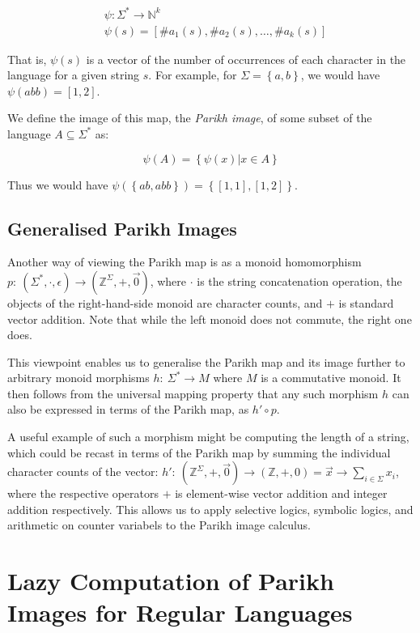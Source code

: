 \documentclass[runningheads]{llncs}
\begin{document}
$$
\begin{aligned}
& \psi: \Sigma^* \rightarrow \mathbb{N}^k \\
& \psi(s) = \left[\#a_1(s), \#a_2(s), \ldots, \#a_k(s)\right]
\end{aligned}
$$

That is, $\psi(s)$ is a vector of the number of occurrences of each character in the language for a given string $s$. For example, for  $\Sigma = \left \{ a, b\right\}$, we would have $\psi(abb) = \left[1, 2\right]$.

We define the image of this map, the \textit{Parikh image}, of some subset of the language $A \subseteq \Sigma^*$ as:

$$
\psi(A) = \left\{ \psi(x) | x \in A \right\}
$$

Thus we would have $\psi(\left\{ab, abb\right\}) = \left\{\left[1, 1\right], \left[1, 2\right]\right\}$.

\subsection{Generalised Parikh Images}\label{sec:generalised}

Another way of viewing the Parikh map is as a monoid homomorphism $p:\: \left(\Sigma^*, \cdot, \epsilon \right) \to (\mathbb{Z}^\Sigma, +, \vec{0})$, where $\cdot$ is the string concatenation operation, the objects of the right-hand-side monoid are character counts, and $+$ is standard vector addition. Note that while the left monoid does not commute, the right one does.

This viewpoint enables us to generalise the Parikh map and its image further to arbitrary monoid morphisms $h:\: \Sigma^* \to M$ where $M$ is a commutative monoid. It then follows from the universal mapping property that any such morphism $h$ can also be expressed in terms of the Parikh map, as $h' \circ p$.

A useful example of such a morphism might be computing the length of a string,
which could be recast in terms of the Parikh map by summing the individual
character counts of the vector: $h':\: (\mathbb{Z}^\Sigma, +, \vec{0}) \to
(\mathbb{Z}, +, 0) = \vec{x} \to \sum_{i \in \Sigma} x_i$, where the respective
operators $+$ is element-wise vector addition and integer addition respectively.
This allows us to apply selective logics, symbolic logics, and arithmetic on
counter variabels to the Parikh image calculus.

\section{Lazy Computation of Parikh Images for Regular Languages}

%
\printbibliography
\end{document}

